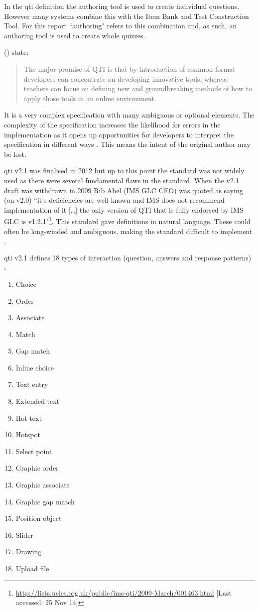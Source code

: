 In the \gls{qti} definition the authoring tool is used to create individual questions. However many systems combine this with the Item Bank and Test Construction Tool. For this report ``\gls{authoring}" refers to this combination and, as such, an authoring tool is used to create whole quizzes.

 (\citeyear{wikieassessment}) state:
\begin{quote}
The major promise of QTI is that by introduction of common format developers can concentrate on developing innovative tools, whereas teachers can focus on defining new and groundbreaking methods of how to apply those tools in an online environment.
\end{quote}

It is a very complex specification with many ambiguous or optional elements. The complexity of the specification increases the likelihood for errors in the implementation as it opens up opportunities for developers to interpret the specification in different ways \citep{failQTI}. This means the intent of the original author may be lost.

\gls{qti} v2.1 was finalised in 2012 \citep{qtiOverview} but up to this point the standard was not widely used \citep{eps265979} as there were several fundamental flaws in the standard. When the v2.1 draft was withdrawn in 2009 Rib Abel (IMS GLC CEO) was quoted as saying (on v2.0) ``it’s deficiencies are well known and IMS does not recommend implementation of it [\dots] the only version of QTI that is fully endorsed by IMS GLC is v1.2.1"\footnote{\url{http://lists.ucles.org.uk/public/ims-qti/2009-March/001463.html} [Last accessed: 25 Nov 14]}. This standard gave definitions in natural language. These could often be long-winded and ambiguous, making the standard difficult to implement \citep{failQTI, Sclater2007}.

\gls{qti} v2.1 defines 18 types of interaction (question, answers and response patterns) \citep{qtiImplementation}:
\begin{multicols}{3}
\begin{enumerate}
\item Choice
\item Order
\item Associate
\item Match
\item Gap match
\item Inline choice
\item Text entry
\item Extended text
\item Hot text
\item Hotspot
\item Select point
\item Graphic order
\item Graphic associate
\item Graphic gap match
\item Position object
\item Slider
\item Drawing
\item Upload file
\end{enumerate}
\end{multicols}

